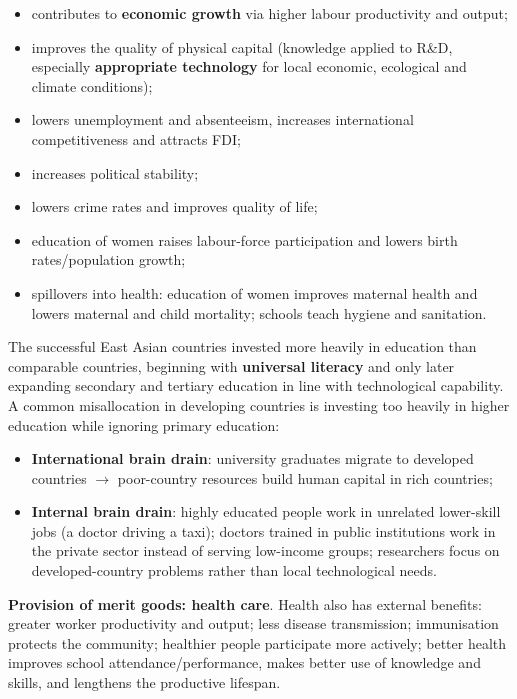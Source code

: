 \documentclass[a4paper,12pt]{article}
\begin{document}
\begin{itemize}
  \item contributes to \textbf{economic growth} via higher labour productivity and output;
  \item improves the quality of physical capital (knowledge applied to R\&D, especially \textbf{appropriate technology} for local economic, ecological and climate conditions);
  \item lowers unemployment and absenteeism, increases international competitiveness and attracts FDI;
  \item increases political stability;
  \item lowers crime rates and improves quality of life;
  \item education of women raises labour-force participation and lowers birth rates/population growth;
  \item spillovers into health: education of women improves maternal health and lowers maternal and child mortality; schools teach hygiene and sanitation.
\end{itemize}
The successful East Asian countries invested more heavily in education than comparable countries, beginning with \textbf{universal literacy} and only later expanding secondary and tertiary education in line with technological capability. A common misallocation in developing countries is investing too heavily in higher education while ignoring primary education:
\begin{itemize}
  \item \textbf{International brain drain}: university graduates migrate to developed countries $\to$ poor-country resources build human capital in rich countries;
  \item \textbf{Internal brain drain}: highly educated people work in unrelated lower-skill jobs (a doctor driving a taxi); doctors trained in public institutions work in the private sector instead of serving low-income groups; researchers focus on developed-country problems rather than local technological needs.
\end{itemize}
\textbf{Provision of merit goods: health care}. Health also has external benefits: greater worker productivity and output; less disease transmission; immunisation protects the community; healthier people participate more actively; better health improves school attendance/performance, makes better use of knowledge and skills, and lengthens the productive lifespan.
\end{document}
